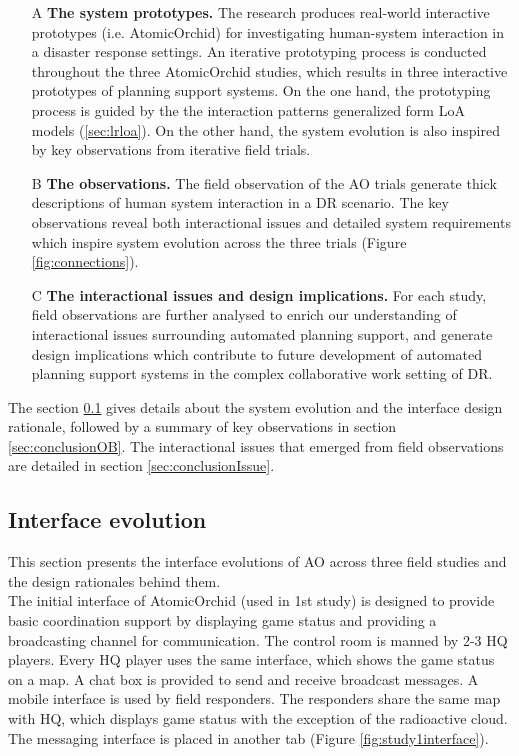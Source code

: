 \begin{enumerate}
  \item[A] \textbf{The system prototypes.} The research produces real-world interactive prototypes (i.e. AtomicOrchid) for investigating human-system interaction in a disaster response settings. An iterative prototyping process is conducted throughout the three AtomicOrchid studies, which results in three interactive prototypes of planning support systems. On the one hand, the prototyping process is guided by the the interaction patterns generalized form \ac{LoA} models (\ref{sec:lrloa}). On the other hand, the system evolution is also inspired by key observations from iterative field trials. 
  
  \item[B] \textbf{The observations.} The field observation of the \ac{AO} trials generate thick descriptions of human system interaction in a \ac{DR} scenario. The key observations reveal both interactional issues and detailed system requirements which inspire system evolution across the three trials (Figure \ref{fig:connections}).
  
  \item[C] \textbf{The interactional issues and design implications.} For each study, field observations are further analysed to enrich our understanding of interactional issues surrounding automated planning support, and generate design implications which contribute to future development of automated planning support systems in the complex collaborative work setting of \ac{DR}. 
\end{enumerate}

The section \ref{sec:conclusionIE} gives details about the system evolution and the interface design rationale, followed by a summary of key observations in section \ref{sec:conclusionOB}. The interactional issues that emerged from field observations are detailed in section \ref{sec:conclusionIssue}. \\



\subsection{Interface evolution}\label{sec:conclusionIE}
This section presents the interface evolutions of \acf{AO} across three field studies and the design rationales behind them.\\

The initial interface of AtomicOrchid (used in 1st study) is designed to provide basic coordination support by displaying game status and providing a broadcasting channel for communication. The control room is manned by 2-3 HQ players. Every HQ player uses the same interface, which shows the game status on a map. A chat box is provided to send and receive broadcast messages. A mobile interface is used by field responders. The responders share the same map with HQ, which displays game status with the exception of the radioactive cloud. The messaging interface is placed in another tab (Figure \ref{fig:study1interface}).\\ 

